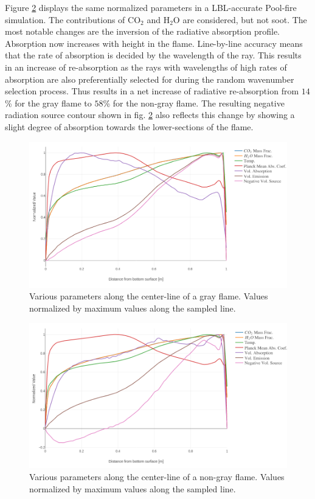 Figure \ref{fig:PoolFire_lineplot_nongray} displays the same normalized parameters in a LBL-accurate Pool-fire simulation. The contributions of CO$_2$ and H$_2$O are considered, but not soot.
The most notable changes are the inversion of the radiative absorption profile. Absorption now increases with height in the flame. Line-by-line accuracy means that the rate of absorption is decided by the wavelength of the ray.
This results in an increase of re-absorption as the rays with wavelengths of high rates of absorption are also preferentially selected for during the random wavenumber selection process. Thus results in a net increase of radiative re-absorption from $14$\% for the gray flame to $58$\% for the non-gray flame.
The resulting negative radiation source contour shown in fig. \ref{fig:PoolFire_lineplot_nongray} also reflects this change by showing a slight degree of absorption towards the lower-sections of the flame.

\begin{figure}[!ht]
\includegraphics[width=\linewidth]{figures/ch4/line_plot.png}
\caption{Various parameters along the center-line of a gray flame. Values normalized by maximum values along the sampled line.}
\label{fig:PoolFire_lineplot}
\end{figure}


\begin{figure}[!ht]
\includegraphics[width=\linewidth]{figures/ch4/line_plot_nongray.png}
\caption{Various parameters along the center-line of a non-gray flame. Values normalized by maximum values along the sampled line.}
\label{fig:PoolFire_lineplot_nongray}
\end{figure}

